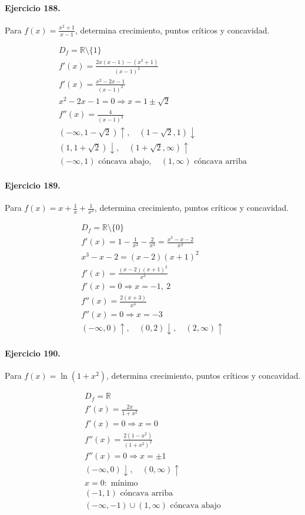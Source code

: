 \documentclass[11pt,a4paper]{article}
\begin{document}
\paragraph{Ejercicio 188.} Para $f(x)=\frac{x^2+1}{x-1}$, determina crecimiento, puntos críticos y concavidad.

\[
\begin{aligned}
D_f=\mathbb{R}\setminus\{1\}\\
f'(x)=\frac{2x(x-1)-(x^2+1)}{(x-1)^2}\\
f'(x)=\frac{x^2-2x-1}{(x-1)^2}\\
x^2-2x-1=0\Rightarrow x=1\pm\sqrt2\\
f''(x)=\frac{4}{(x-1)^3}\\
(-\infty,1-\sqrt2)\uparrow,\quad(1-\sqrt2,1)\downarrow\\
(1,1+\sqrt2)\downarrow,\quad(1+\sqrt2,\infty)\uparrow\\
(-\infty,1)\text{{ cóncava abajo}},\quad(1,\infty)\text{{ cóncava arriba}}
\end{aligned}
\]


\paragraph{Ejercicio 189.} Para $f(x)=x+\frac{1}{x}+\frac{1}{x^2}$, determina crecimiento, puntos críticos y concavidad.

\[
\begin{aligned}
D_f=\mathbb{R}\setminus\{0\}\\
f'(x)=1-\frac{1}{x^2}-\frac{2}{x^3}=\frac{x^3-x-2}{x^3}\\
x^3-x-2=(x-2)(x+1)^2\\
f'(x)=\frac{(x-2)(x+1)^2}{x^3}\\
f'(x)=0\Rightarrow x=-1,\ 2\\
f''(x)=\frac{2(x+3)}{x^4}\\
f''(x)=0\Rightarrow x=-3\\
(-\infty,0)\uparrow,\quad(0,2)\downarrow,\quad(2,\infty)\uparrow
\end{aligned}
\]


\paragraph{Ejercicio 190.} Para $f(x)=\ln(1+x^2)$, determina crecimiento, puntos críticos y concavidad.

\[
\begin{aligned}
D_f=\mathbb{R}\\
f'(x)=\frac{2x}{1+x^2}\\
f'(x)=0\Rightarrow x=0\\
f''(x)=\frac{2(1-x^2)}{(1+x^2)^2}\\
f''(x)=0\Rightarrow x=\pm1\\
(-\infty,0)\downarrow,\quad(0,\infty)\uparrow\\
x=0:\text{{ mínimo}}\\
(-1,1)\text{{ cóncava arriba}}\\
(-\infty,-1)\cup(1,\infty)\text{{ cóncava abajo}}
\end{aligned}
\]
\end{document}

